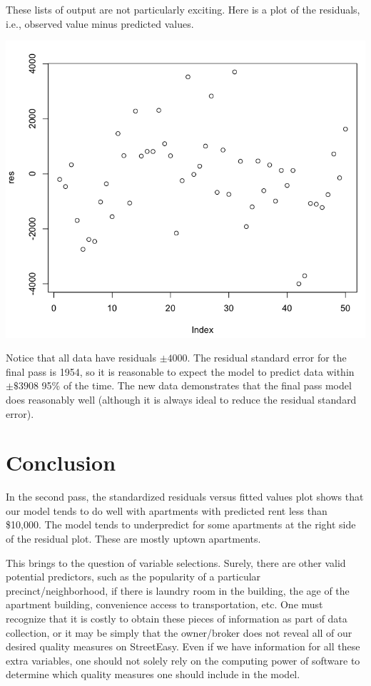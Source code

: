 \documentclass[a4 paper, 11 pt, twocolumn]{article}
\begin{document}
These lists of output are not particularly exciting. Here is a plot of the residuals, i.e., observed value minus predicted values.
\begin{center}
\includegraphics[scale=0.3]{resplot}
\end{center}
Notice that all data have residuals $\pm 4000$. The residual standard error for the final pass is 1954, so it is reasonable to expect the model to predict data within $\pm \$3908$ 95\% of the time. The new data demonstrates that the final pass model does reasonably well (although it is always ideal to reduce the residual standard error).
\section{Conclusion}
In the second pass, the standardized residuals versus fitted values plot shows that our model tends to do well with apartments with predicted rent less than \$10,000. The model tends to underpredict for some apartments at the right side of the residual plot. These are mostly uptown apartments.

This brings to the question of variable selections. Surely, there are other valid potential predictors, such as the popularity of a particular precinct/neighborhood, if there is laundry room in the building, the age of the apartment building, convenience access to transportation, etc. One must recognize that it is costly to obtain these pieces of information as part of data collection, or it may be simply that the owner/broker does not reveal all of our desired quality measures on StreetEasy. Even if we have information for all these extra variables, one should not solely rely on the computing power of software to determine which quality measures one should include in the model.
\end{document}
